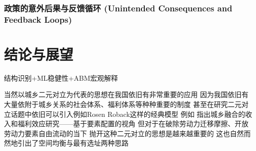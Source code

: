 \documentclass[
  a4paper,
  zihao=-4,
  fontset=mac,
  AutoFakeBold,
  AutoFakeSlant,
  oneside]{ctexbook}
\begin{document}


\subsection{政策的意外后果与反馈循环 (Unintended Consequences and Feedback Loops)}






\chapter{结论与展望}

结构识别+ML稳健性+ABM宏观解释


当然以城乡二元对立为代表的思想在我国依旧有非常重要的应用 因为我国依旧有大量依附于城乡关系的社会体系、福利体系等种种重要的制度
甚至在研究二元对立话题中依旧可以引入例如Rosen Roback这样的经典模型
例如 
\textcite{GuoDongMeiChengXiangRongHeDeShouRuHeFuLiXiaoYingYanJiuJiYuYaoSuPeiZhiDeShiJiao2023}指出城乡融合的收入和福利效应研究——基于要素配置的视角
但对于在破除劳动力迁移摩擦、开放劳动力要素自由流动的当下
抛开这种二元对立的思想是越来越重要的
这也自然而然地引出了空间均衡与最有选址两种思路
\end{document}
